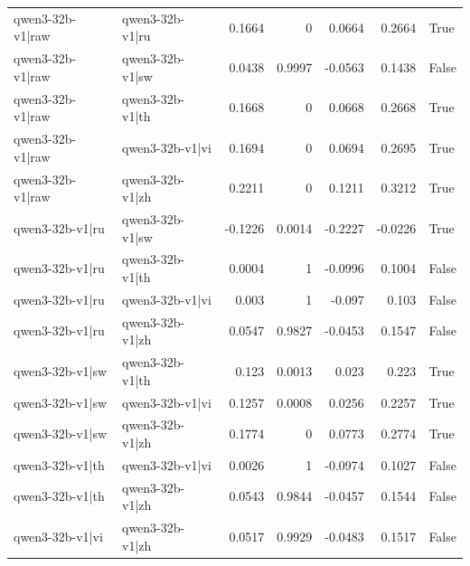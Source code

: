 \begin{table}
\begin{tabular}{l l r r r r l}
qwen3-32b-v1|raw & qwen3-32b-v1|ru & 0.1664 & 0 & 0.0664 & 0.2664 & True \\
qwen3-32b-v1|raw & qwen3-32b-v1|sw & 0.0438 & 0.9997 & -0.0563 & 0.1438 & False \\
qwen3-32b-v1|raw & qwen3-32b-v1|th & 0.1668 & 0 & 0.0668 & 0.2668 & True \\
qwen3-32b-v1|raw & qwen3-32b-v1|vi & 0.1694 & 0 & 0.0694 & 0.2695 & True \\
qwen3-32b-v1|raw & qwen3-32b-v1|zh & 0.2211 & 0 & 0.1211 & 0.3212 & True \\
qwen3-32b-v1|ru & qwen3-32b-v1|sw & -0.1226 & 0.0014 & -0.2227 & -0.0226 & True \\
qwen3-32b-v1|ru & qwen3-32b-v1|th & 0.0004 & 1 & -0.0996 & 0.1004 & False \\
qwen3-32b-v1|ru & qwen3-32b-v1|vi & 0.003 & 1 & -0.097 & 0.103 & False \\
qwen3-32b-v1|ru & qwen3-32b-v1|zh & 0.0547 & 0.9827 & -0.0453 & 0.1547 & False \\
qwen3-32b-v1|sw & qwen3-32b-v1|th & 0.123 & 0.0013 & 0.023 & 0.223 & True \\
qwen3-32b-v1|sw & qwen3-32b-v1|vi & 0.1257 & 0.0008 & 0.0256 & 0.2257 & True \\
qwen3-32b-v1|sw & qwen3-32b-v1|zh & 0.1774 & 0 & 0.0773 & 0.2774 & True \\
qwen3-32b-v1|th & qwen3-32b-v1|vi & 0.0026 & 1 & -0.0974 & 0.1027 & False \\
qwen3-32b-v1|th & qwen3-32b-v1|zh & 0.0543 & 0.9844 & -0.0457 & 0.1544 & False \\
qwen3-32b-v1|vi & qwen3-32b-v1|zh & 0.0517 & 0.9929 & -0.0483 & 0.1517 & False \\
\bottomrule
\end{tabular}
\end{table}
